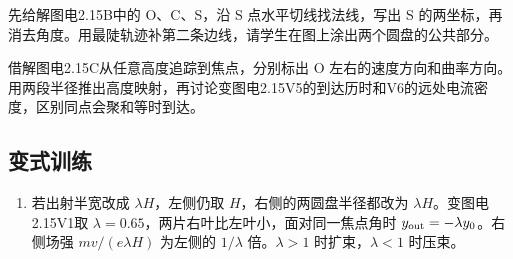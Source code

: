 \documentclass[UTF8,fontset=fandol,a4paper,11pt]{ctexart}
\begin{document}
先给解图电2.15B中的 O、C、S，沿 S 点水平切线找法线，写出 S 的两坐标，再消去角度。用最陡轨迹补第二条边线，请学生在图上涂出两个圆盘的公共部分。

借解图电2.15C从任意高度追踪到焦点，分别标出 O 左右的速度方向和曲率方向。用两段半径推出高度映射，再讨论变图电2.15V5的到达历时和V6的远处电流密度，区别同点会聚和等时到达。


\subsection*{变式训练}

\begin{enumerate}
\item 若出射半宽改成 $\lambda H$，左侧仍取 $H$，右侧的两圆盘半径都改为 $\lambda H$。变图电2.15V1取 $\lambda=0.65$，两片右叶比左叶小，面对同一焦点角时 $y_{\rm out}=-\lambda y_0$。右侧场强 $mv/(e\lambda H)$ 为左侧的 $1/\lambda$ 倍。$\lambda>1$ 时扩束，$\lambda<1$ 时压束。
\begin{center}\begin{minipage}{.98\linewidth}\centering
{}
\end{minipage}
\end{center}
\end{enumerate}
\end{document}
